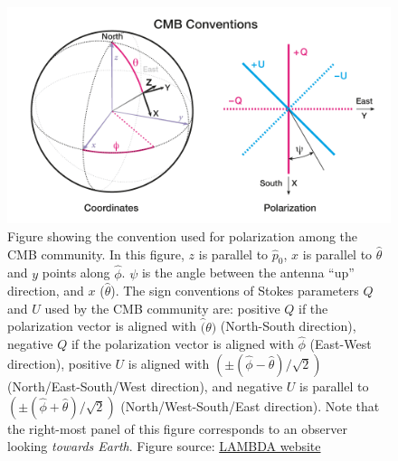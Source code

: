 \documentclass[a4paper,fleqn]{cas-dc}\sloppy
\begin{document}
	\begin{figure}
		\centering
		\includegraphics[width=1\linewidth]{figures/cmb_coord_convention}
		\caption{Figure showing the convention used for polarization among the CMB community. In this figure, $z$ is parallel to $\hat{p}_0$, $x$ is parallel to $\hat{\theta}$ and $y$ points along $\hat{\phi}$. $\psi$ is the angle between the antenna ``up'' direction, and $x$ ($\hat{\theta}$). The sign conventions of Stokes parameters $Q$ and $U$ used by the CMB community are: positive $Q$ if the polarization vector is aligned with $\hat(\theta)$ (North-South direction), negative $Q$ if the polarization vector is aligned with $\hat{\phi}$ (East-West direction), positive $U$ is aligned with $(\pm(\hat{\phi} - \hat{\theta})/\sqrt{2} )$ (North/East-South/West direction), and negative $U$ is parallel to $(\pm(\hat{\phi} + \hat{\theta})/\sqrt{2} )$ (North/West-South/East direction). Note that the right-most panel of this figure corresponds to an observer looking \textsl{towards Earth}. Figure source: \href{https://lambda.gsfc.nasa.gov/product/about/pol_convention.cfm}{LAMBDA website}}
		\label{fig::cmbcoordconvention}
	\end{figure}
\end{document}
